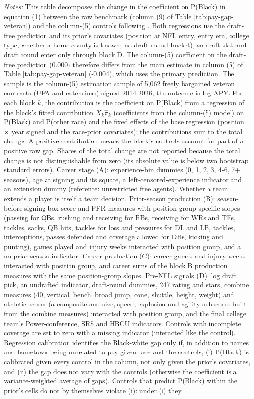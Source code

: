 {\footnotesize
\noindent\textit{Notes:} This table decomposes the change in the coefficient on P(Black) in equation (1) between the raw benchmark (column (9) of Table \ref{tab:pay-gap-veteran}) and the column-(5) controls following \citet{gelbach2016covariates}. Both regressions use the draft-free prediction and its prior's covariates (position at NFL entry, entry era, college type, whether a home county is known; no draft-round bucket), so draft slot and draft round enter only through block D. The column-(5) coefficient on the draft-free prediction (0.000) therefore differs from the main estimate in column (5) of Table \ref{tab:pay-gap-veteran} (-0.004), which uses the primary prediction. The sample is the column-(5) estimation sample of 5,062 freely bargained veteran contracts (UFA and extensions) signed 2014-2026; the outcome is log APY. For each block $k$, the contribution is the coefficient on P(Black) from a regression of the block's fitted contribution $X_k\hat\pi_k$ (coefficients from the column-(5) model) on P(Black) and P(other race) and the fixed effects of the base regression (position $\times$ year signed and the race-prior covariates); the contributions sum to the total change. A positive contribution means the block's controls account for part of a positive raw gap. Shares of the total change are not reported because the total change is not distinguishable from zero (its absolute value is below two bootstrap standard errors). Career stage (A): experience-bin dummies (0, 1, 2, 3, 4-6, 7+ seasons), age at signing and its square, a left-censored-experience indicator and an extension dummy (reference: unrestricted free agents). Whether a team extends a player is itself a team decision. Prior-season production (B): season-before-signing box-score and PFR measures with position-group-specific slopes (passing for QBs, rushing and receiving for RBs, receiving for WRs and TEs, tackles, sacks, QB hits, tackles for loss and pressures for DL and LB, tackles, interceptions, passes defended and coverage allowed for DBs, kicking and punting), games played and injury weeks interacted with position group, and a no-prior-season indicator. Career production (C): career games and injury weeks interacted with position group, and career sums of the block B production measures with the same position-group slopes. Pre-NFL signals (D): log draft pick, an undrafted indicator, draft-round dummies, 247 rating and stars, combine measures (40, vertical, bench, broad jump, cone, shuttle, height, weight) and athletic scores (a composite and size, speed, explosion and agility subscores built from the combine measures) interacted with position group, and the final college team's Power-conference, SRS and HBCU indicators. Controls with incomplete coverage are set to zero with a missing indicator (interacted like the control). Regression calibration identifies the Black-white gap only if, in addition to names and hometown being unrelated to pay given race and the controls, (i) P(Black) is calibrated given every control in the column, not only given the prior's covariates, and (ii) the gap does not vary with the controls (otherwise the coefficient is a variance-weighted average of gaps). Controls that predict P(Black) within the prior's cells do not by themselves violate (i): under (i) they }
